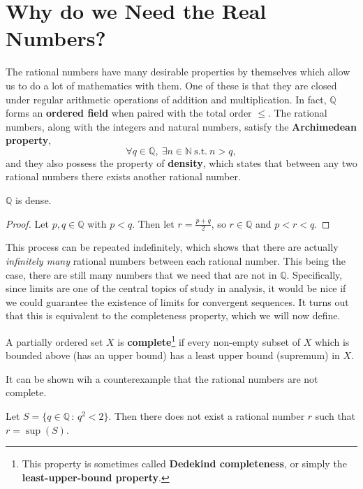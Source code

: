 \documentclass[../real_analysis.tex]{subfiles}
\begin{document}
    \section{Why do we Need the Real Numbers?}
        The rational numbers have many desirable properties by themselves which allow us to do a lot of mathematics with them. One of these is that they are closed under regular arithmetic operations of addition and multiplication. In fact, $\mathbb{Q}$ forms an \textbf{ordered field} when paired with the total order $\leq$. The rational numbers, along with the integers and natural numbers, satisfy the \textbf{Archimedean property},
        \[\forall q\in\mathbb{Q},\ \exists n\in\mathbb{N}\ \mathrm{s.t.}\ n>q,\]
        and they also possess the property of \textbf{density}, which states that between any two rational numbers there exists another rational number.
        \begin{theorem}
            $\mathbb{Q}$ is dense.
        \end{theorem}
        \begin{proof}
            Let $p,q\in\mathbb{Q}$ with $p<q$. Then let $r=\frac{p+q}{2}$, so $r\in\mathbb{Q}$ and $p<r<q$.
        \end{proof}
        This process can be repeated indefinitely, which shows that there are actually \textit{infinitely many} rational numbers between each rational number. This being the case, there are still many numbers that we need that are not in $\mathbb{Q}$. Specifically, since limits are one of the central topics of study in analysis, it would be nice if we could guarantee the existence of limits for convergent sequences. It turns out that this is equivalent to the completeness property, which we will now define.
        \begin{definition}
            A partially ordered set $X$ is \textbf{complete}\footnote{This property is sometimes called \textbf{Dedekind completeness}, or simply the \textbf{least-upper-bound property}.} if every non-empty subset of $X$ which is bounded above (has an upper bound) has a least upper bound (supremum) in $X$.
        \end{definition}
        It can be shown wih a counterexample that the rational numbers are not complete.
        \begin{theorem}
            Let $S=\{q\in\mathbb{Q}\,:\,q^2<2\}$. Then there does not exist a rational number $r$ such that $r=\sup(S)$.
        \end{theorem}
\end{document}
